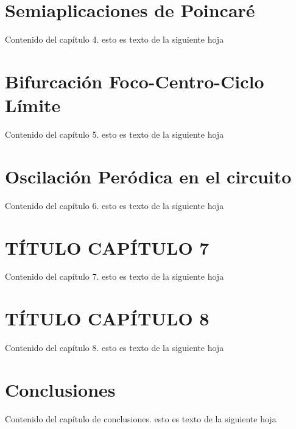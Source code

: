 \documentclass[12pt,a4paper]{report} %
\begin{document}
	\chapter{Semiaplicaciones de Poincaré}
	Contenido del capítulo 4.
	\newpage
	esto es texto de la siguiente hoja
	
	\chapter{Bifurcación Foco-Centro-Ciclo Límite}
	Contenido del capítulo 5.
	\newpage
	esto es texto de la siguiente hoja
	
	\chapter{Oscilación Peródica en el circuito}
	Contenido del capítulo 6.
	\newpage
	esto es texto de la siguiente hoja
	
	\chapter{TÍTULO CAPÍTULO 7}
	Contenido del capítulo 7.
	\newpage
	esto es texto de la siguiente hoja
	
	\chapter{TÍTULO CAPÍTULO 8}
	Contenido del capítulo 8.
	\newpage
	esto es texto de la siguiente hoja
	
	\chapter*{Conclusiones}
	Contenido del capítulo de conclusiones.
	\newpage
	esto es texto de la siguiente hoja
	

\end{document}

